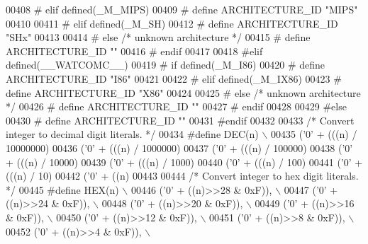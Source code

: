 \begin{DoxyCode}
{{{{{{{{{{{{{{{{{{{{{{{{{{{{{{{{{{{00408 \textcolor{preprocessor}{# elif defined(\_M\_MIPS)}
00409 \textcolor{preprocessor}{#  define ARCHITECTURE\_ID "MIPS"}
00410 
00411 \textcolor{preprocessor}{# elif defined(\_M\_SH)}
00412 \textcolor{preprocessor}{#  define ARCHITECTURE\_ID "SHx"}
00413 
00414 \textcolor{preprocessor}{# else }\textcolor{comment}{/* unknown architecture */}\textcolor{preprocessor}{}
00415 \textcolor{preprocessor}{#  define ARCHITECTURE\_ID ""}
00416 \textcolor{preprocessor}{# endif}
00417 
00418 \textcolor{preprocessor}{#elif defined(\_\_WATCOMC\_\_)}
00419 \textcolor{preprocessor}{# if defined(\_M\_I86)}
00420 \textcolor{preprocessor}{#  define ARCHITECTURE\_ID "I86"}
00421 
00422 \textcolor{preprocessor}{# elif defined(\_M\_IX86)}
00423 \textcolor{preprocessor}{#  define ARCHITECTURE\_ID "X86"}
00424 
00425 \textcolor{preprocessor}{# else }\textcolor{comment}{/* unknown architecture */}\textcolor{preprocessor}{}
00426 \textcolor{preprocessor}{#  define ARCHITECTURE\_ID ""}
00427 \textcolor{preprocessor}{# endif}
00428 
00429 \textcolor{preprocessor}{#else}
00430 \textcolor{preprocessor}{#  define ARCHITECTURE\_ID ""}
00431 \textcolor{preprocessor}{#endif}
00432 
00433 \textcolor{comment}{/* Convert integer to decimal digit literals.  */}
00434 \textcolor{preprocessor}{#define DEC(n)                   \(\backslash\)}
00435 \textcolor{preprocessor}{  ('0' + (((n) / 10000000)%
00436 \textcolor{preprocessor}{  ('0' + (((n) / 1000000)%
00437 \textcolor{preprocessor}{  ('0' + (((n) / 100000)%
00438 \textcolor{preprocessor}{  ('0' + (((n) / 10000)%
00439 \textcolor{preprocessor}{  ('0' + (((n) / 1000)%
00440 \textcolor{preprocessor}{  ('0' + (((n) / 100)%
00441 \textcolor{preprocessor}{  ('0' + (((n) / 10)%
00442 \textcolor{preprocessor}{  ('0' +  ((n) %
00443 
00444 \textcolor{comment}{/* Convert integer to hex digit literals.  */}
00445 \textcolor{preprocessor}{#define HEX(n)             \(\backslash\)}
00446 \textcolor{preprocessor}{  ('0' + ((n)>>28 & 0xF)), \(\backslash\)}
00447 \textcolor{preprocessor}{  ('0' + ((n)>>24 & 0xF)), \(\backslash\)}
00448 \textcolor{preprocessor}{  ('0' + ((n)>>20 & 0xF)), \(\backslash\)}
00449 \textcolor{preprocessor}{  ('0' + ((n)>>16 & 0xF)), \(\backslash\)}
00450 \textcolor{preprocessor}{  ('0' + ((n)>>12 & 0xF)), \(\backslash\)}
00451 \textcolor{preprocessor}{  ('0' + ((n)>>8  & 0xF)), \(\backslash\)}
00452 \textcolor{preprocessor}{  ('0' + ((n)>>4  & 0xF)), \(\backslash\)}
}}}}}}}}}}}}}}}}}}}}}}}}}}}}}}}}}}}}}}}}}}}
\end{DoxyCode}
